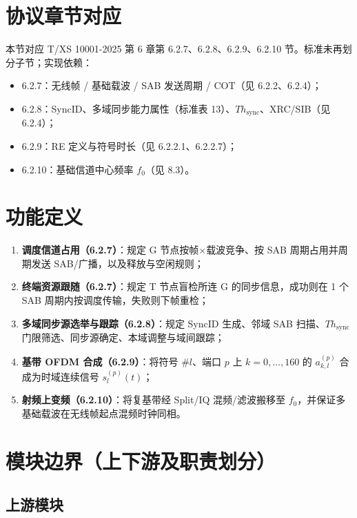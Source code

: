 \documentclass[11pt,a4paper]{ctexart}
\begin{document}
\section{协议章节对应}

本节对应 T/XS 10001-2025 第 6 章第 6.2.7、6.2.8、6.2.9、6.2.10 节。标准未再划分子节；实现依赖：
\begin{itemize}[nosep]
  \item 6.2.7：无线帧 / 基础载波 / SAB 发送周期 / COT（见 6.2.2、6.2.4）；
  \item 6.2.8：SyncID、多域同步能力属性（标准表 13）、$Th_{\mathrm{sync}}$、XRC/SIB（见 6.2.4）；
  \item 6.2.9：RE 定义与符号时长（见 6.2.2.1、6.2.2.7）；
  \item 6.2.10：基础信道中心频率 $f_0$（见 8.3）。
\end{itemize}

\section{功能定义}

\begin{enumerate}[nosep]
  \item \textbf{调度信道占用（6.2.7）}：规定 G 节点按帧$\times$载波竞争、按 SAB 周期占用并周期发送 SAB/广播，以及释放与空闲规则；
  \item \textbf{终端资源跟随（6.2.7）}：规定 T 节点盲检所连 G 的同步信息，成功则在 1 个 SAB 周期内按调度传输，失败则下帧重检；
  \item \textbf{多域同步源选举与跟踪（6.2.8）}：规定 SyncID 生成、邻域 SAB 扫描、$Th_{\mathrm{sync}}$ 门限筛选、同步源确定、本域调整与域间跟踪；
  \item \textbf{基带 OFDM 合成（6.2.9）}：将符号 \#$l$、端口 $p$ 上 $k{=}0,\ldots,160$ 的 $a_{k,l}^{(p)}$ 合成为时域连续信号 $s_l^{(p)}(t)$；
  \item \textbf{射频上变频（6.2.10）}：将复基带经 Split/IQ 混频/滤波搬移至 $f_0$，并保证多基础载波在无线帧起点混频时钟同相。
\end{enumerate}

\section{模块边界（上下游及职责划分）}

\subsection{上游模块}
\end{document}
